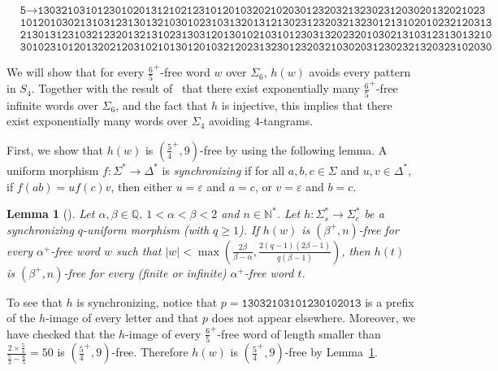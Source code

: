 \documentclass[final]{dmtcs-episciences}
\def\paren#1{\left( #1 \right)}
\renewcommand{\ge}{\geqslant}
\theoremstyle{plain}
\newtheorem{lemma}[theorem]{Lemma}
\theoremstyle{definition}
\theoremstyle{remark}
\begin{document}
{\begin{align*}
 &\texttt{5}\rightarrow\texttt{130321031012301020131210212310120103202102030123203213230231203020132021023}\\ &\texttt{1012010302131031231301321030102310313201312130231232032132301213102010232120313}\\ &\texttt{2130131231032123201321310231303120130102103101230313202320103021310312313013210}\\ &\texttt{3010231012013202120310210130120103212023132301232032103020312302321320323102030}
\end{align*}
}

We will show that for every $\tfrac65^+$-free word $w$ over $\Sigma_6$, 
$h(w)$ avoids every pattern in $S_4$.
Together with the result of~\cite{Kolpakov(2011)} that there exist
exponentially many $\tfrac65^+$-free infinite words over $\Sigma_6$, and the fact that $h$ is injective,
this implies that there exist exponentially many words over $\Sigma_4$ avoiding 4-tangrams.

First, we show that $h(w)$ is $\paren{\tfrac54^+,9}$-free by using the following lemma.
A uniform morphism $f:\Sigma^*\rightarrow\Delta^*$ is \emph{synchronizing}
if for all $a,b,c\in\Sigma$ and $u,v\in \Delta^*$, if $f(ab)=uf(c)v$, then either $u=\varepsilon$ and $a=c$, or $v=\varepsilon$ and $b=c$.
\begin{lemma}[\cite{Ochem(2006)}]\label{sync}
Let $\alpha,\beta\in\mathbb{Q},\ 1<\alpha<\beta<2$ and $n\in\mathbb{N}^*$.
Let $h:\Sigma^*_s\rightarrow\Sigma^*_e$ be a synchronizing $q$-uniform morphism (with $q\ge 1$).
If $h(w)$ is $\paren{\beta^+,n}$-free for every $\alpha^+$-free word $w$ such that
$|w|<\max\paren{\frac{2\beta}{\beta-\alpha},\frac{2(q-1)(2\beta-1)}{q(\beta-1)}}$,
then $h(t)$ is $\paren{\beta^+,n}$-free for every (finite or infinite) $\alpha^+$-free word $t$.
\end{lemma}
To see that $h$ is synchronizing, notice that $p=\texttt{13032103101230102013}$ is a prefix of the $h$-image of every letter and that $p$ does not appear elsewhere.
Moreover, we have checked that the $h$-image of every $\tfrac65^+$-free word of length smaller than $\frac{2\times\tfrac54}{\tfrac54-\tfrac65}=50$ is $\paren{\tfrac54^+,9}$-free.
Therefore $h(w)$ is $\paren{\frac54^+,9}$-free by Lemma~\ref{sync}. 

\end{document}
